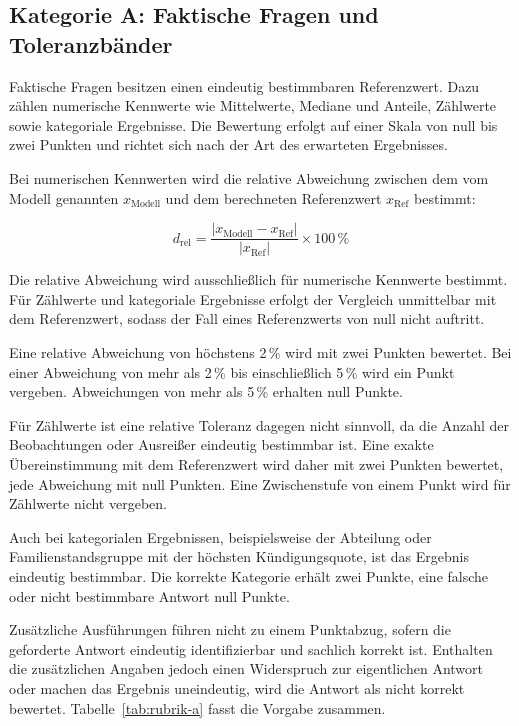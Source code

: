 \subsection{Kategorie A: Faktische Fragen und Toleranzbänder}

Faktische Fragen besitzen einen eindeutig bestimmbaren Referenzwert. Dazu zählen numerische Kennwerte wie Mittelwerte, Mediane und Anteile, Zählwerte sowie kategoriale Ergebnisse. Die Bewertung erfolgt auf einer Skala von null bis zwei Punkten und richtet sich nach der Art des erwarteten Ergebnisses.

Bei numerischen Kennwerten wird die relative Abweichung zwischen dem vom Modell genannten $x_{\mathrm{Modell}}$ und dem berechneten Referenzwert $x_{\mathrm{Ref}}$ bestimmt:

\[
d_{\mathrm{rel}} =
\frac{|x_{\mathrm{Modell}}-x_{\mathrm{Ref}}|}
{|x_{\mathrm{Ref}}|}
\times 100\,\%
\]

Die relative Abweichung wird ausschließlich für numerische Kennwerte bestimmt. Für Zählwerte und kategoriale Ergebnisse erfolgt der Vergleich unmittelbar mit dem Referenzwert, sodass der Fall eines Referenzwerts von null nicht auftritt.

Eine relative Abweichung von höchstens 2\,\% wird mit zwei Punkten bewertet.
Bei einer Abweichung von mehr als 2\,\% bis einschließlich 5\,\% wird ein Punkt
vergeben. Abweichungen von mehr als 5\,\% erhalten null Punkte. 

Für Zählwerte ist eine relative Toleranz dagegen nicht sinnvoll, da die Anzahl der Beobachtungen oder Ausreißer eindeutig bestimmbar ist. Eine exakte Übereinstimmung mit dem Referenzwert wird daher mit zwei Punkten bewertet, jede Abweichung mit null Punkten. Eine Zwischenstufe von einem Punkt wird für Zählwerte nicht vergeben.

Auch bei kategorialen Ergebnissen, beispielsweise der Abteilung oder Familienstandsgruppe mit der höchsten Kündigungsquote, ist das Ergebnis eindeutig bestimmbar. Die korrekte Kategorie erhält zwei Punkte, eine falsche oder nicht bestimmbare Antwort null Punkte.

Zusätzliche Ausführungen führen nicht zu einem Punktabzug, sofern die geforderte Antwort eindeutig identifizierbar und sachlich korrekt ist. Enthalten die zusätzlichen Angaben jedoch einen Widerspruch zur eigentlichen Antwort oder machen das Ergebnis uneindeutig, wird die Antwort als nicht korrekt bewertet. Tabelle~\ref{tab:rubrik-a} fasst die Vorgabe zusammen.


